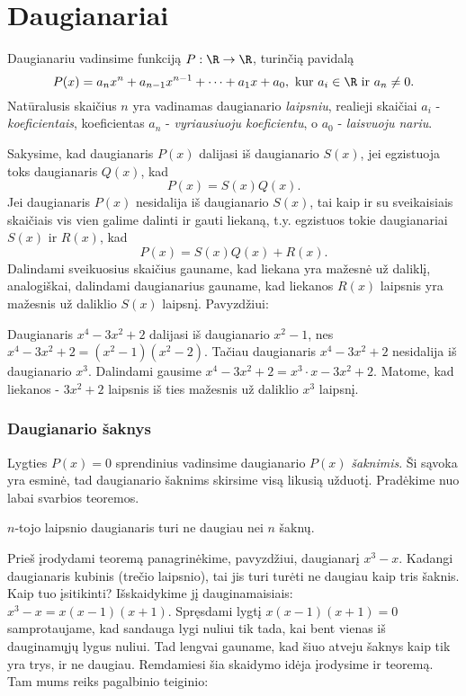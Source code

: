 \section{Daugianariai}

Daugianariu vadinsime funkciją $P:\R \rightarrow \R$, turinčią pavidalą
$$P(x) = a_nx^n + a_{n-1}x^{n-1} + \cdots +a_1x + a_0, \text{ kur } a_i\in
\R \text{ ir } a_n \neq 0.$$
Natūralusis skaičius $n$ yra vadinamas daugianario \emph{laipsniu},
realieji skaičiai $a_i$ - \emph{koeficientais}, koeficientas $a_n$ -
\emph{vyriausiuoju koeficientu}, o $a_0$ - \emph{laisvuoju nariu}. 

Sakysime, kad daugianaris $P(x)$ dalijasi iš daugianario $S(x)$, jei
egzistuoja toks daugianaris $Q(x)$, kad $$P(x)=S(x)Q(x).$$ Jei daugianaris
$P(x)$ nesidalija iš daugianario $S(x)$, tai kaip ir su sveikaisiais
skaičiais vis vien galime dalinti ir gauti liekaną, t.y. egzistuos tokie
daugianariai $S(x)$ ir $R(x)$, kad $$P(x) = S(x)Q(x) + R(x).$$ Dalindami
sveikuosius skaičius gauname, kad liekana yra mažesnė už daliklį,
analogiškai, dalindami daugianarius gauname, kad liekanos $R(x)$ laipsnis
yra mažesnis už daliklio $S(x)$ laipsnį. Pavyzdžiui:

Daugianaris $x^4 - 3x^2 + 2$ dalijasi iš daugianario $x^2 - 1$, nes $x^4 -
3x^2 + 2 = (x^2 - 1)(x^2 - 2)$. Tačiau daugianaris $x^4 - 3x^2 + 2$
nesidalija iš daugianario $x^3$. Dalindami gausime $x^4 - 3x^2 + 2 =
x^3\cdot x - 3x^2 + 2.$ Matome, kad liekanos - $3x^2 + 2$ laipsnis iš ties
mažesnis už daliklio $x^3$ laipsnį.      

\subsubsection{Daugianario šaknys}

Lygties $P(x) = 0$ sprendinius vadinsime daugianario $P(x)$
\emph{šaknimis}. Ši sąvoka yra esminė, tad daugianario šaknims skirsime
visą likusią užduotį. Pradėkime nuo labai svarbios teoremos.

\begin{thm}
$n$-tojo laipsnio daugianaris turi ne daugiau nei $n$ šaknų.
\end{thm}

Prieš įrodydami teoremą panagrinėkime, pavyzdžiui, daugianarį $x^3 - x$.
Kadangi daugianaris kubinis (trečio laipsnio), tai jis turi turėti ne
daugiau kaip tris šaknis. Kaip tuo įsitikinti? Išskaidykime jį
dauginamaisiais: $x^3-x =x(x-1)(x+1).$ Spręsdami lygtį $x(x-1)(x+1) = 0$
samprotaujame, kad sandauga lygi nuliui tik tada, kai bent vienas iš
dauginamųjų lygus nuliui. Tad lengvai gauname, kad šiuo atveju šaknys kaip
tik yra trys, ir ne daugiau. Remdamiesi šia skaidymo idėja įrodysime ir
teoremą. Tam mums reiks pagalbinio teiginio:

